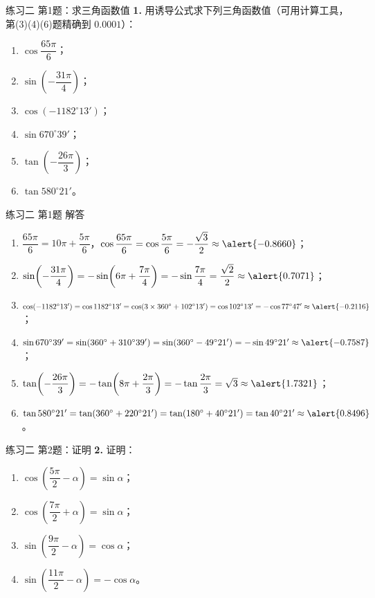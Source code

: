 \documentclass[10pt,aspectratio=169,serif]{beamer}
\begin{document}
\begin{frame}[t]{练习二 第1题：求三角函数值}
\textbf{1.} 用诱导公式求下列三角函数值（可用计算工具，第(3)(4)(6)题精确到 $0.0001$）：
\begin{enumerate}[(1)]
  \item $\cos\dfrac{65\pi}{6}$； \qquad
  \item $\sin\!\left(-\dfrac{31\pi}{4}\right)$； \qquad
  \item $\cos(-1182^\circ13')$；
  \item $\sin 670^\circ39'$； \qquad
  \item $\tan\!\left(-\dfrac{26\pi}{3}\right)$； \qquad
  \item $\tan 580^\circ21'$。
\end{enumerate}
\end{frame}

\begin{frame}[t]{练习二 第1题 解答}
\begin{tcolorbox}[colback=orange!10,colframe=orange,title=\textbf{解}]
\begin{enumerate}[(1)]
  \item $\dfrac{65\pi}{6}=10\pi+\dfrac{5\pi}{6}$，$\cos\dfrac{65\pi}{6}=\cos\dfrac{5\pi}{6}=-\dfrac{\sqrt3}{2}\approx\alert{-0.8660}$；
  \item $\sin\!\left(-\dfrac{31\pi}{4}\right)=-\sin\!\left(6\pi+\dfrac{7\pi}{4}\right)=-\sin\dfrac{7\pi}{4}=\dfrac{\sqrt2}{2}\approx\alert{0.7071}$；
  \item $\cos(-1182^\circ13')=\cos1182^\circ13'=\cos(3\times360^\circ+102^\circ13')=\cos102^\circ13'=-\cos77^\circ47'\approx\alert{-0.2116}$；
  \item $\sin670^\circ39'=\sin(360^\circ+310^\circ39')=\sin(360^\circ-49^\circ21')=-\sin49^\circ21'\approx\alert{-0.7587}$；
  \item $\tan\!\left(-\dfrac{26\pi}{3}\right)=-\tan\!\left(8\pi+\dfrac{2\pi}{3}\right)=-\tan\dfrac{2\pi}{3}=\sqrt3\approx\alert{1.7321}$；
  \item $\tan580^\circ21'=\tan(360^\circ+220^\circ21')=\tan(180^\circ+40^\circ21')=\tan40^\circ21'\approx\alert{0.8496}$。
\end{enumerate}
\end{tcolorbox}
\end{frame}

\begin{frame}[t]{练习二 第2题：证明}
\textbf{2.} 证明：
\begin{enumerate}[(1)]
  \item $\cos\!\left(\dfrac{5\pi}{2}-\alpha\right)=\sin\alpha$； \qquad
  \item $\cos\!\left(\dfrac{7\pi}{2}+\alpha\right)=\sin\alpha$；
  \item $\sin\!\left(\dfrac{9\pi}{2}-\alpha\right)=\cos\alpha$； \qquad
  \item $\sin\!\left(\dfrac{11\pi}{2}-\alpha\right)=-\cos\alpha$。
\end{enumerate}
\end{frame}
\end{document}

